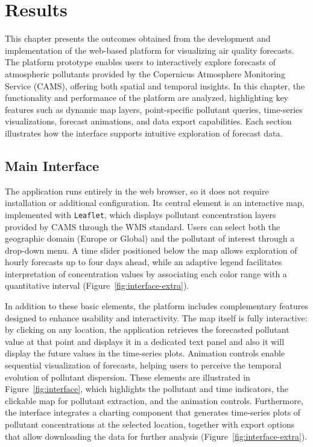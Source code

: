 \chapter[Results]{Results}


This chapter presents the outcomes obtained from the development and implementation of the web-based platform for visualizing air quality forecasts. The platform prototype enables users to interactively explore forecasts of atmospheric pollutants provided by the Copernicus Atmosphere Monitoring Service (CAMS), offering both spatial and temporal insights. In this chapter, the functionality and performance of the platform are analyzed, highlighting key features such as dynamic map layers, point-specific pollutant queries, time-series visualizations, forecast animations, and data export capabilities. Each section illustrates how the interface supports intuitive exploration of forecast data.

\section{Main Interface}

The application runs entirely in the web browser, so it does not require installation or additional configuration. 
Its central element is an interactive map, implemented with \texttt{Leaflet}, which displays pollutant concentration layers provided by CAMS through the WMS standard. 
Users can select both the geographic domain (Europe or Global) and the pollutant of interest through a drop-down menu. 
A time slider positioned below the map allows exploration of hourly forecasts up to four days ahead, while an adaptive legend facilitates interpretation of concentration values by associating each color range with a quantitative interval (Figure~\ref{fig:interface-extra}).

In addition to these basic elements, the platform includes complementary features designed to enhance usability and interactivity. 
The map itself is fully interactive: by clicking on any location, the application retrieves the forecasted pollutant value at that point and displays it in a dedicated text panel and also it will display the future values in the time-series plots. 
Animation controls enable sequential visualization of forecasts, helping users to perceive the temporal evolution of pollutant dispersion. 
These elements are illustrated in Figure~\ref{fig:interface}, which highlights the pollutant and time indicators, the clickable map for pollutant extraction, and the animation controls.
Furthermore, the interface integrates a charting component that generates time-series plots of pollutant concentrations at the selected location, together with export options that allow downloading the data for further analysis (Figure~\ref{fig:interface-extra}).

